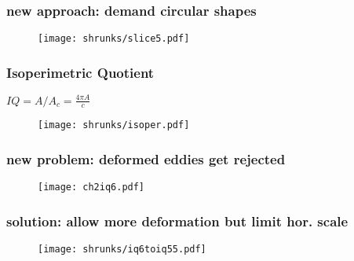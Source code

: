 \begin{frame}
 \frametitle{new approach: demand circular shapes}
\begin{figure}
	\centering	
	\texttt{[image: shrunks/slice5.pdf]}
\end{figure}
\end{frame}

\begin{frame}
 \frametitle{Isoperimetric Quotient}
  $IQ= A/A_{c}=\frac{4 \pi A}{c}$
\begin{figure}
	\texttt{[image: shrunks/isoper.pdf]}
\end{figure}
\end{frame}

\begin{frame}
 \frametitle{new problem: deformed eddies get rejected}
\begin{figure}
	\centering
	\texttt{[image: ch2iq6.pdf]}
\end{figure}
\end{frame}


\begin{frame}
 \frametitle{solution: allow more deformation but limit hor. scale}
\begin{figure}
	\centering
	\texttt{[image: shrunks/iq6toiq55.pdf]}
\end{figure}
\end{frame}

